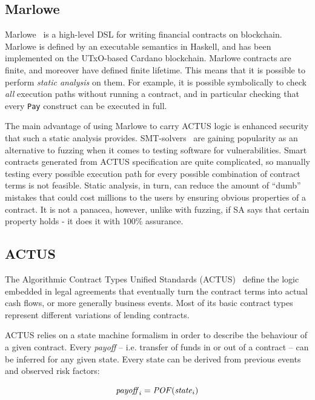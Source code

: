 \documentclass[runningheads]{llncs}
\newcommand{\ident}[1]{\mbox{\emph{#1}}}
\begin{document}
\subsection{Marlowe}

Marlowe~\cite{marlowe} is a high-level DSL for writing
financial contracts on blockchain. Marlowe is defined
by an executable semantics in Haskell, and has been implemented on
the UTxO-based Cardano blockchain. 
Marlowe contracts are finite, and moreover have defined finite lifetime. This means that it is possible to perform \emph{static analysis} on them. For example, it is possible symbolically to check \emph{all} execution paths without running a contract, and in particular checking that every \texttt{Pay} construct can be executed in full.

The main advantage of using Marlowe to carry ACTUS logic is enhanced
security that such a static analysis provides. SMT-solvers~\cite{smt} are gaining
popularity as an alternative to fuzzing when it comes to testing software
for vulnerabilities. Smart contracts generated from ACTUS
specification are quite complicated, so manually testing every possible
execution path for every possible combination of contract terms is
not feasible. Static analysis, in turn, can reduce the amount of ``dumb''
mistakes that could cost millions to the users by ensuring obvious
properties of a contract. It is not a panacea, however, unlike with
fuzzing, if SA says that certain property holds - it does it with
100\% assurance.

\subsection{ACTUS}
\label{ACTUS}

The Algorithmic Contract Types Unified Standards (ACTUS)~\cite{actus} define the logic embedded in legal agreements that eventually
turn the contract terms into actual cash flows, or more generally
business events. Most of its basic contract types represent
different variations of lending contracts.

ACTUS relies on a state machine formalism in order to describe the
behaviour of a given contract. Every \emph{payoff} -- i.e. transfer of funds in
or out of a contract -- can be inferred for any given state. Every state
can be derived from previous events and observed risk factors:

\noindent 
\begin{equation}
\ident{payoff}_{i}=\ident{POF}(\ident{state}_{i})
\end{equation}
\end{document}
